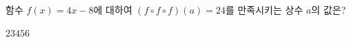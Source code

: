 \hspace*{2mm}\begin{minipage}[t]{\dimexpr\linewidth-2mm\relax}\vspace{0pt}
함수 $f(x)=4x-8$에 대하여 $(f\circ f\circ f)(a)=24$를 만족시키는 상수 $a$의 값은?
\begin{choices32}{$2$}{$3$}{$4$}{$5$}{$6$}\end{choices32}\end{minipage}

